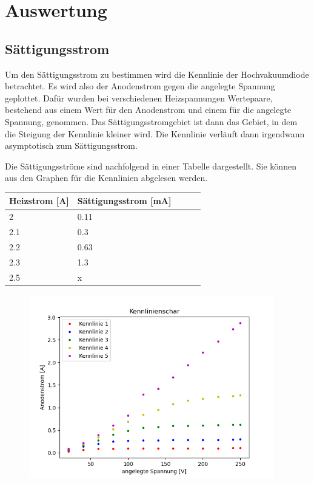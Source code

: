 \section{Auswertung}

\subsection{Sättigungsstrom}

Um den Sättigungsstrom zu bestimmen wird die Kennlinie der Hochvakuumdiode betrachtet. Es wird also der Anodenstrom gegen die angelegte Spannung geplottet. Dafür wurden bei verschiedenen Heizspannungen Wertepaare, bestehend aus einem Wert für den Anodenstrom und einem für die angelegte Spannung, genommen. Das Sättigungsstromgebiet ist dann das Gebiet, in dem die Steigung der Kennlinie kleiner wird. Die Kennlinie verläuft dann irgendwann asymptotisch zum Sättigungsstrom.

\noindent Die Sättigungsströme sind nachfolgend in einer Tabelle dargestellt. Sie können aus den Graphen für die Kennlinien abgelesen werden.

\begin{minipage}{\linewidth}
    \begin{table}[H]
        \centering
    
    \begin{tabular}{lllll}
        \toprule
        Heizstrom [A] & Sättigungsstrom [mA]\\
        \midrule
        2 & 0.11 \\
        2.1 & 0.3 \\
        2.2 & 0.63 \\
        2.3 & 1.3 \\
        2.5 & x \\
        \bottomrule   
    \end{tabular}
    \label{tab:1}
\end{table}
\end{minipage}

\begin{figure}[H]
    \centering
    \includegraphics[height=8cm]{"Kennlinie1.png"}
\end{figure}

